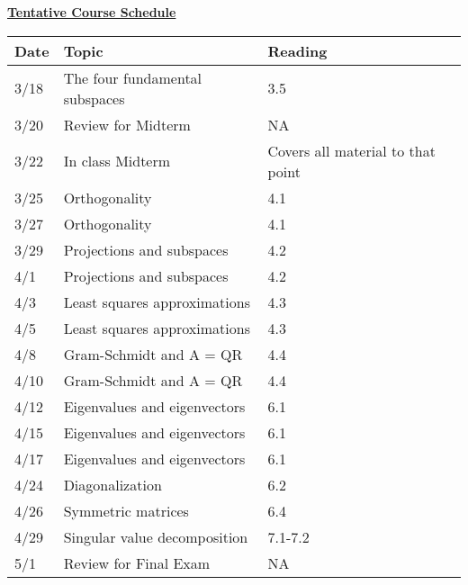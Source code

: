 \documentclass[11pt, a4paper]{article}
\begin{document}
\centerline{\Large \underline{\textbf{Tentative Course Schedule}}}
\vspace{5pt}
\small
\begin{tabular}{ |p{0.5in}|p{4.0in}|p{1.0in}| }
\hline
  \textbf{Date} & \textbf{Topic} & \textbf{Reading}  \\ \hline
3/18 & The four fundamental subspaces &  3.5 \\ \hline
3/20 & Review for Midterm &  NA \\ \hline
3/22 & In class Midterm &   Covers all material to that point \\ \hline
3/25 & Orthogonality &  4.1 \\ \hline
3/27 & Orthogonality &  4.1 \\ \hline
3/29 & Projections and subspaces &  4.2 \\ \hline
4/1 & Projections and subspaces &  4.2 \\ \hline
4/3 & Least squares approximations &  4.3 \\ \hline
4/5 & Least squares approximations &  4.3 \\ \hline
4/8 & Gram-Schmidt and A = QR &  4.4 \\ \hline
4/10 & Gram-Schmidt and A = QR &  4.4 \\ \hline
4/12 & Eigenvalues and eigenvectors &  6.1 \\ \hline
4/15 & Eigenvalues and eigenvectors &  6.1 \\ \hline
4/17 & Eigenvalues and eigenvectors &  6.1 \\ \hline
4/24 & Diagonalization &  6.2 \\ \hline
4/26 & Symmetric matrices &  6.4 \\ \hline
4/29 & Singular value decomposition &  7.1-7.2 \\ \hline
5/1 & Review for Final Exam &  NA \\ \hline
\end{tabular}

\end{document}
